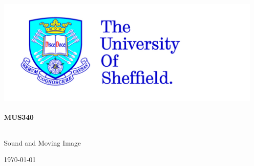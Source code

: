 
\begin{titlepage}

\begin{center}



\includegraphics[scale=0.2]{tuoslogo_cmyk_hi} \\




\HRule \\[0.4cm]
{ \huge \bfseries MUS340}\\[0.4cm]

\HRule \\[1.5cm]

\begin{minipage}{0.6\textwidth}
\begin{flushleft} \large
Sound and Moving Image\\
\end{flushleft}
\end{minipage}

\vfill

{\large \today}

\end{center}

\end{titlepage}
